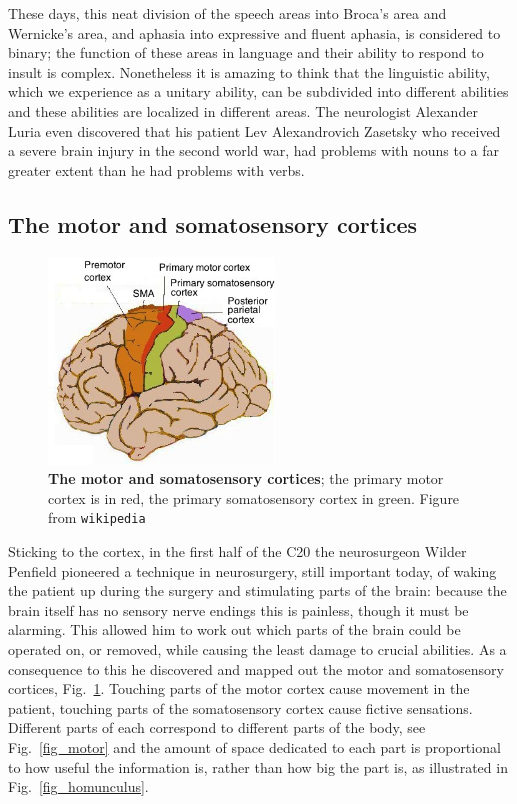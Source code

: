 \documentclass[12pt]{article}
\begin{document}
These days, this neat division of the speech areas into Broca's area
and Wernicke's area, and aphasia into expressive and fluent aphasia,
is considered to binary; the function of these areas in language and
their ability to respond to insult is complex. Nonetheless it is
amazing to think that the linguistic ability, which we experience as a
unitary ability, can be subdivided into different abilities and these
abilities are localized in different areas. The neurologist Alexander
Luria even discovered that his patient Lev Alexandrovich Zasetsky who
received a severe brain injury in the second world war, had problems
with nouns to a far greater extent than he had problems with verbs.

\subsection*{The motor and somatosensory cortices}


\begin{figure}[tbhp]
  \begin{center}
  \includegraphics[width=6cm]{Human_motor_cortex.jpg}
\end{center}
  \caption{\textbf{The motor and somatosensory cortices}; the primary motor
    cortex is in red, the primary somatosensory cortex in green. Figure from
    \texttt{wikipedia}\label{fig_m_and_s}}
\end{figure}


Sticking to the cortex, in the first half of the C20 the neurosurgeon
Wilder Penfield pioneered a technique in neurosurgery, still important
today, of waking the patient up during the surgery and stimulating
parts of the brain: because the brain itself has no sensory nerve
endings this is painless, though it must be alarming. This allowed him
to work out which parts of the brain could be operated on, or removed,
while causing the least damage to crucial abilities. As a consequence
to this he discovered and mapped out the motor and somatosensory cortices,
Fig.~\ref{fig_m_and_s}. Touching parts of the motor cortex cause
movement in the patient, touching parts of the somatosensory cortex cause
fictive sensations. Different parts of each correspond to different
parts of the body, see Fig.~\ref{fig_motor} and the amount of space
dedicated to each part is proportional to how useful the information
is, rather than how big the part is, as illustrated in Fig.~\ref{fig_homunculus}.
\end{document}
